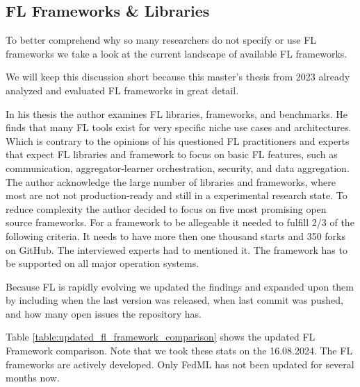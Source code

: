 \subsection{FL Frameworks \& Libraries}\label{subsection:fl_frameworks_and_libraries}

To better comprehend why so many researchers do not specify or use FL frameworks we take a look
at the current landscape of available FL frameworks.

We will keep this discussion short because this master's thesis \cite{thesis:tum_fl_framework_comparison}
from 2023 already analyzed and evaluated FL frameworks in great detail.

In his thesis the author examines FL libraries, frameworks, and benchmarks.
He finds that many FL tools exist for very specific niche use cases and architectures.
Which is contrary to the opinions of his questioned FL practitioners and experts that
expect FL libraries and framework to focus on basic FL features,
such as communication, aggregator-learner orchestration, security, and data aggregation.
The author acknowledge the large number of libraries and frameworks, where most
are not not production-ready and still in a experimental research state.
To reduce complexity the author decided to focus on five most promising open source frameworks.
For a framework to be allegeable it needed to fulfill 2/3 of the following criteria.
It needs to have more then one thousand starts and 350 forks on GitHub.
The interviewed experts had to mentioned it.
The framework has to be supported on all major operation systems.

Because FL is rapidly evolving we updated the findings and expanded upon them by including when
the last version was released, when last commit was pushed, and how many open issues the repository has.



Table \ref{table:updated_fl_framework_comparison} shows the updated FL Framework comparison.
Note that we took these stats on the 16.08.2024.
The FL frameworks are actively developed. 
Only FedML has not been updated for several months now.